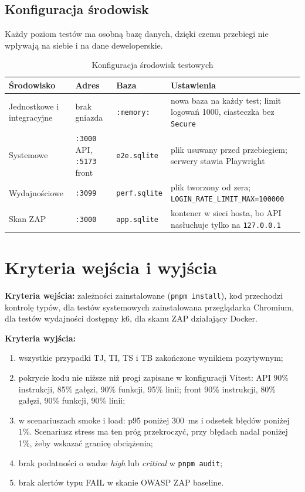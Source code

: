 \documentclass[a4paper,11pt]{article}
\newcommand{\code}[1]{\texttt{\small #1}}
\begin{document}
\subsection{Konfiguracja środowisk}
Każdy poziom testów ma osobną bazę danych, dzięki czemu przebiegi nie wpływają na siebie
i na dane deweloperskie.

\begin{table}[H]
\centering\small
\begin{tabularx}{\textwidth}{@{}l l l L@{}}
\toprule
\textsf{\textbf{Środowisko}} & \textsf{\textbf{Adres}} & \textsf{\textbf{Baza}} & \textsf{\textbf{Ustawienia}}\\
\midrule
Jednostkowe i integracyjne & brak gniazda & \code{:memory:} & nowa baza na każdy test; limit logowań 1000, ciasteczka bez \code{Secure}\\
Systemowe & \code{:3000} API, \code{:5173} front & \code{e2e.sqlite} & plik usuwany przed przebiegiem; serwery stawia Playwright\\
Wydajnościowe & \code{:3099} & \code{perf.sqlite} & plik tworzony od zera; \code{LOGIN\_RATE\_LIMIT\_MAX=100000}\\
Skan ZAP & \code{:3000} & \code{app.sqlite} & kontener w sieci hosta, bo API nasłuchuje tylko na \code{127.0.0.1}\\
\bottomrule
\end{tabularx}
\caption{Konfiguracja środowisk testowych}
\end{table}

\section{Kryteria wejścia i wyjścia}

\textbf{Kryteria wejścia:} zależności zainstalowane (\code{pnpm install}), kod przechodzi
kontrolę typów, dla testów systemowych zainstalowana przeglądarka Chromium, dla testów
wydajności dostępny k6, dla skanu ZAP działający Docker.

\textbf{Kryteria wyjścia:}
\begin{enumerate}
  \item wszystkie przypadki TJ, TI, TS i TB zakończone wynikiem pozytywnym;
  \item pokrycie kodu nie niższe niż progi zapisane w konfiguracji Vitest:
        API 90\% instrukcji, 85\% gałęzi, 90\% funkcji, 95\% linii;
        front 90\% instrukcji, 80\% gałęzi, 90\% funkcji, 90\% linii;
  \item w scenariuszach smoke i load: p95 poniżej 300~ms i odsetek błędów poniżej 1\%.
        Scenariusz stress ma ten próg przekroczyć, przy błędach nadal poniżej 1\%,
        żeby wskazać granicę obciążenia;
  \item brak podatności o wadze \emph{high} lub \emph{critical} w \code{pnpm audit};
  \item brak alertów typu FAIL w skanie OWASP ZAP baseline.
\end{enumerate}
\end{document}
